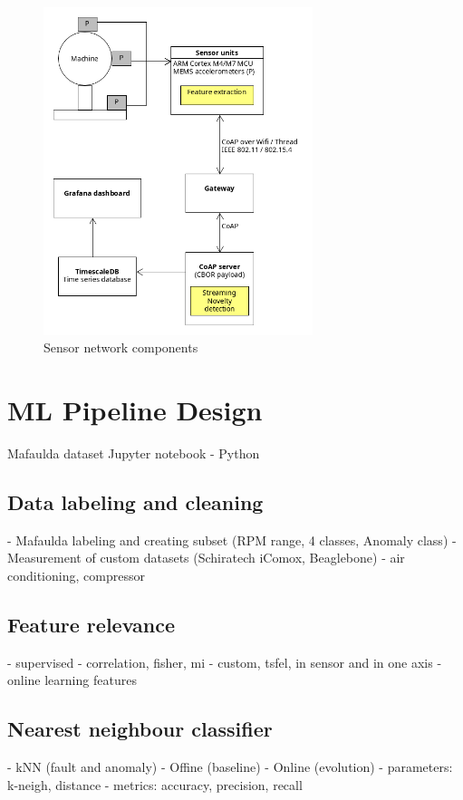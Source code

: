 \begin{figure}[h]
\centering
\includegraphics[width=0.7\textwidth]{assets/sensor-network.png}
\caption{Sensor network components}
\end{figure}


\chapter{ML Pipeline Design}

Mafaulda dataset
Jupyter notebook - Python


\section{Data labeling and cleaning}
- Mafaulda labeling and creating subset (RPM range, 4 classes, Anomaly class)
- Measurement of custom datasets (Schiratech iComox, Beaglebone) - air conditioning, compressor

\section{Feature relevance}
- supervised - correlation, fisher, mi
- custom, tsfel, in sensor and in one axis
- online learning features

\section{Nearest neighbour classifier}
- kNN (fault and anomaly)
	- Offine (baseline)
	- Online (evolution)
- parameters: k-neigh, distance
- metrics: accuracy, precision, recall


